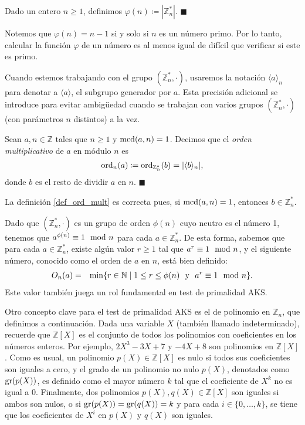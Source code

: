 \begin{definition}
Dado un entero $n \geq 1$, definimos $\varphi(n) \coloneqq |\mathbb{Z}_n^*|$. \hfill$\blacksquare$
\end{definition}

Notemos que $\varphi(n) = n - 1$ si y solo si
$n$ es un número primo. Por lo tanto, calcular la función $\varphi$ de un número es al menos igual de difícil que verificar si este es primo.


Cuando estemos trabajando con el grupo $(\mathbb{Z}_n^*, \cdot)$, usaremos la notación $\langle a\rangle_n$ para denotar a $\langle a \rangle$, el subgrupo generador por $a$. Esta precisión adicional se introduce para evitar ambigüedad cuando se trabajan con varios grupos $(\mathbb{Z}_n^*, \cdot)$ (con parámetros $n$ distintos) a la vez.

\begin{definition}\label{def_ord_mult}
	 Sean $a, n\in \mathbb{Z}$ tales que $n \geq 1$ y ${\rm mcd}(a,n)=1$. Decimos que el \emph{orden multiplicativo} de $a$ en módulo $n$ es
         \begin{eqnarray*}
         \mathrm{ord}_{n}(a) \coloneqq \mathrm{ord}_{\mathbb{Z}_n^*}(b) = |\langle b \rangle _n|,
         \end{eqnarray*}
	donde $b$ es el resto de dividir $a$ en $n$. \hfill$\blacksquare$
\end{definition}

La definición \ref{def_ord_mult} es correcta pues, si ${\rm mcd}(a, n) = 1$, entonces $b \in \mathbb{Z}_n^*$.




Dado que $(\mathbb{Z}_n^*, \cdot)$ es un grupo de orden $\phi(n)$ cuyo
neutro es el número 1, tenemos que $a^{\phi(n)} \equiv 1 \mod n$ para
cada $a \in \mathbb{Z}_n^*$. De esta forma, sabemos que para cada $a
\in \mathbb{Z}_n^*$, existe algún valor $r \geq 1$ tal que $a^r \equiv
1 \mod n$, y el siguiente número, conocido como el orden de $a$ en
$n$, está bien definido:
\begin{eqnarray*}
  O_n(a) & = & \min \{ r \in \mathbb{N} \mid 1 \leq r \leq \phi(n)
  \ \text{ y } \ a^r \equiv 1 \mod n \}.
\end{eqnarray*}
Este valor también juega un rol fundamental en test de primalidad AKS.

Otro concepto clave para el test de primalidad AKS es el de
polinomio en $\mathbb{Z}_n$, que definimos a continuación. Dada una
variable $X$ (también llamado indeterminado), recuerde que
$\mathbb{Z}[X]$ es el conjunto de todos los polinomios con
coeficientes en los números enteros. Por ejemplo, $2 X^3 - 3X +7$ y
$-4 X + 8$ son polinomios en $\mathbb{Z}[X]$. Como es usual, un
polinomio $p(X) \in \mathbb{Z}[X]$ es nulo si todos sus coeficientes
son iguales a cero, y el grado de un polinomio no nulo $p(X)$,
denotados como ${\rm gr}(p(X))$, es definido como el mayor número $k$
tal que el coeficiente de $X^k$ no es igual a $0$. Finalmente, dos
polinomios $p(X), q(X) \in \mathbb{Z}[X]$ son iguales si ambos son
nulos, o si ${\rm gr}(p(X))={\rm gr}(q(X)) = k$ y para cada $i \in \{0,
\ldots, k\}$, se tiene que los coeficientes de $X^i$ en $p(X)$ y
$q(X)$ son iguales.


